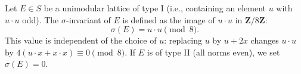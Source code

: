 Let $E \in S$ be a unimodular lattice of type I (i.e., containing an element $u$ with $u \cdot u$ odd). The $\sigma$-invariant of $E$ is defined as the image of $u \cdot u$ in $\mathbf{Z}/8\mathbf{Z}$:
$$
\sigma(E) = u \cdot u \pmod{8}.
$$
This value is independent of the choice of $u$: replacing $u$ by $u + 2x$ changes $u \cdot u$ by $4(u \cdot x + x \cdot x) \equiv 0 \pmod{8}$. If $E$ is of type II (all norms even), we set $\sigma(E) = 0$.
